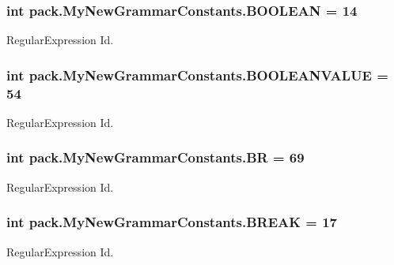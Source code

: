 \subsubsection[{\texorpdfstring{B\+O\+O\+L\+E\+AN}{BOOLEAN}}]{\setlength{\rightskip}{0pt plus 5cm}int pack.\+My\+New\+Grammar\+Constants.\+B\+O\+O\+L\+E\+AN = 14}\hypertarget{interfacepack_1_1_my_new_grammar_constants_a015325ffe3e0580ba2a279bb8454849b}{}\label{interfacepack_1_1_my_new_grammar_constants_a015325ffe3e0580ba2a279bb8454849b}
Regular\+Expression Id. 
\subsubsection[{\texorpdfstring{B\+O\+O\+L\+E\+A\+N\+V\+A\+L\+UE}{BOOLEANVALUE}}]{\setlength{\rightskip}{0pt plus 5cm}int pack.\+My\+New\+Grammar\+Constants.\+B\+O\+O\+L\+E\+A\+N\+V\+A\+L\+UE = 54}\hypertarget{interfacepack_1_1_my_new_grammar_constants_abc1bf0eb2affa705507f80820aa7f1c9}{}\label{interfacepack_1_1_my_new_grammar_constants_abc1bf0eb2affa705507f80820aa7f1c9}
Regular\+Expression Id. 
\subsubsection[{\texorpdfstring{BR}{BR}}]{\setlength{\rightskip}{0pt plus 5cm}int pack.\+My\+New\+Grammar\+Constants.\+BR = 69}\hypertarget{interfacepack_1_1_my_new_grammar_constants_a0c831ed52c7836f5b35a37a450e12b96}{}\label{interfacepack_1_1_my_new_grammar_constants_a0c831ed52c7836f5b35a37a450e12b96}
Regular\+Expression Id. 
\subsubsection[{\texorpdfstring{B\+R\+E\+AK}{BREAK}}]{\setlength{\rightskip}{0pt plus 5cm}int pack.\+My\+New\+Grammar\+Constants.\+B\+R\+E\+AK = 17}\hypertarget{interfacepack_1_1_my_new_grammar_constants_a5e69dad1e02758f04bf69a9882b4d8ee}{}\label{interfacepack_1_1_my_new_grammar_constants_a5e69dad1e02758f04bf69a9882b4d8ee}
Regular\+Expression Id. 
